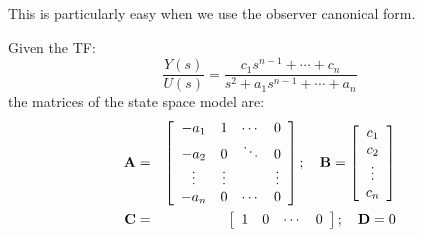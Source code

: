 This is particularly easy when we use the observer canonical form.

Given the TF:
\[
\frac{Y(s)}{U(s)}=\frac{c_1s^{n-1}+\cdots+c_n}{s^2 + a_1s^{n-1}+\cdots+a_n}
\]
the matrices of the state space model are:
\begin{eqnarray*}
	 {\bf{A}} & = & \left[ {\begin{array}{*{20}c}
	   { - a_1 } & 1 &  \cdots  & 0  \\
	   { - a_2 } & 0 &  \ddots  & {0}  \\
	    \vdots  &  \vdots  & {} &  \vdots   \\
	   { - a_n } & 0 &  \cdots  & 0  \\
	\end{array}} \right];\quad {\bf{B}} = \left[ {\begin{array}{*{20}c}
	   {c_1 }  \\
	   {c_2 }  \\
	    \vdots   \\
	   {c_n }  \\
	\end{array}} \right] \\ 
	 {\bf{C}} & = & \left[ {\begin{array}{*{20}c}
	   1 & 0 &  \cdots  & 0  \\
	\end{array}} \right];\quad {\bf{D}} = 0 \\ 	
\end{eqnarray*}


\endinput

